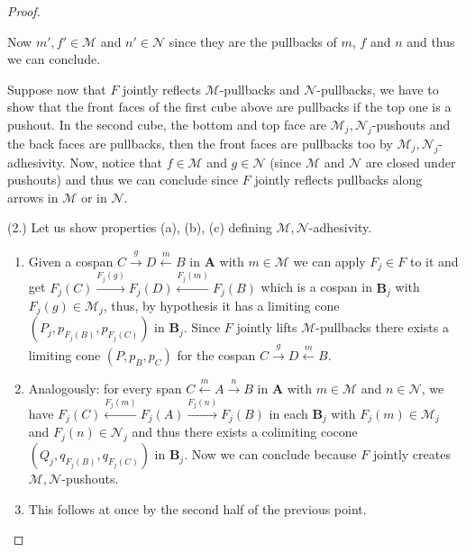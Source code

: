 \documentclass[runningheads,envcountsect]{lmcs}
\newcommand{\catname}[1]{\mathbf{#1}}
\theoremstyle{plain}
\theoremstyle{definition}
\begin{document}
\begin{proof}
\begin{center}
	\end{center}
Now $m', f'\in \mathcal{M}$ and $n'\in \mathcal{N}$ since they are the pullbacks of $m$, $f$ and $n$ and thus we can conclude.
	
		Suppose now that $F$ jointly reflects $\mathcal{M}$-pullbacks and $\mathcal{N}$-pullbacks, we have to show that the front faces of the first cube above are pullbacks if the top one is a pushout. In the second cube, the bottom and top face are $\mathcal{M}_j, \mathcal{N}_j$-pushouts and the back faces are pullbacks, then the front faces are pullbacks too by $\mathcal{M}_j, \mathcal{N}_j$-adhesivity. Now, notice that $f\in \mathcal{M}$ and $g\in \mathcal{N}$ (since $\mathcal{M}$ and $\mathcal{N}$ are closed under pushouts) and thus we can conclude since $F$ jointly reflects pullbacks along arrows in $\mathcal{M}$ or in $\mathcal{N}$.
	
		
	\noindent
		(2.) Let us show properties (a), (b), (c) defining $\mathcal{M}, \mathcal{N}$-adhesivity.
	\begin{enumerate}[label=(\alph*)]
		\item Given a cospan $C\xrightarrow{g}D\xleftarrow{m}B$ in $\catname{A}$ with $m\in \mathcal{M}$ we can apply $F_j\in F$ to it and get $F_j(C)\xrightarrow{F_j(g)}F_j(D)\xleftarrow{F_j(m)}F_j(B)$ which is a cospan in $\catname{B}_j$  with $F_j(g)\in \mathcal{M}_j$, thus, by hypothesis it has a limiting cone $(P_j, p_{F_j(B)}, p_{F_j(C)})$ in $\catname{B}_j$.	Since $F$ jointly lifts $\mathcal{M}$-pullbacks there exists a limiting cone $(P, p_B, p_C)$ for the cospan  $C\xrightarrow{g}D\xleftarrow{m}B$.
		\item Analogously: for every span $C\xleftarrow{m}A\xrightarrow{n}B$ in $\catname{A}$ with $m\in \mathcal{M}$ and $n\in \mathcal{N}$, we have  $F_j(C)\xleftarrow{F_j(m)}F_j(A)\xrightarrow{F_j(n)}F_j(B)$ in each $\catname{B}_j$ with $F_j(m)\in \mathcal{M}_j$ and $F_j(n)\in \mathcal{N}_j$ and thus there exists a colimiting cocone $(Q_j, q_{F_j(B)}, q_{F_j(C)})$ in $\catname{B}_j$. Now we can conclude because $F$ jointly creates $\mathcal{M}, \mathcal{N}$-pushouts.
		\item This follows at once by the second half of the previous point. 
\end{enumerate}	


\end{proof}
\end{document}
